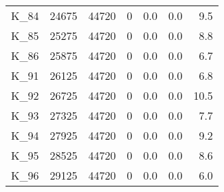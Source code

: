 \begin{tabular}{lrrrrrr}
K\_84 & 24675 & 44720 & 0 & 0.0 & 0.0 & 9.5 \\
K\_85 & 25275 & 44720 & 0 & 0.0 & 0.0 & 8.8 \\
K\_86 & 25875 & 44720 & 0 & 0.0 & 0.0 & 6.7 \\
K\_91 & 26125 & 44720 & 0 & 0.0 & 0.0 & 6.8 \\
K\_92 & 26725 & 44720 & 0 & 0.0 & 0.0 & 10.5 \\
K\_93 & 27325 & 44720 & 0 & 0.0 & 0.0 & 7.7 \\
K\_94 & 27925 & 44720 & 0 & 0.0 & 0.0 & 9.2 \\
K\_95 & 28525 & 44720 & 0 & 0.0 & 0.0 & 8.6 \\
K\_96 & 29125 & 44720 & 0 & 0.0 & 0.0 & 6.0 \\
\bottomrule
\end{tabular}
